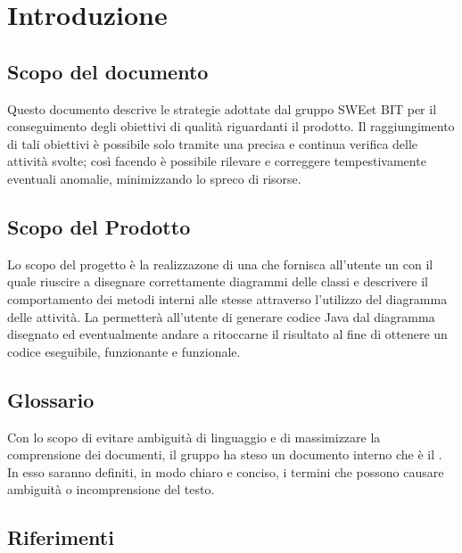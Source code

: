 \section{Introduzione}
  \subsection{Scopo del documento}
          Questo documento descrive le strategie adottate dal gruppo SWEet BIT per il conseguimento degli obiettivi di qualità riguardanti il prodotto.
          Il raggiungimento di tali obiettivi è possibile solo tramite una precisa e continua verifica delle attività svolte; così facendo è possibile
          rilevare e correggere tempestivamente eventuali anomalie, minimizzando lo spreco di risorse.
  \subsection{Scopo del Prodotto}
          Lo scopo del progetto è la realizzazone di una  che fornisca all'utente un   con il quale riuscire a disegnare correttamente diagrammi delle classi
          e descrivere il comportamento dei metodi interni alle stesse attraverso l'utilizzo del diagramma delle attività.
          La  permetterà all'utente di generare codice Java dal diagramma disegnato ed eventualmente andare a ritoccarne il risultato al fine di ottenere un codice
          eseguibile, funzionante e funzionale.
  \subsection{Glossario}
          Con lo scopo di evitare ambiguità di linguaggio e di massimizzare la comprensione dei documenti, il
          gruppo ha steso un documento interno che è il . In esso saranno definiti, in modo
          chiaro e conciso, i termini che possono causare ambiguità o incomprensione del testo.
  \subsection{Riferimenti}
